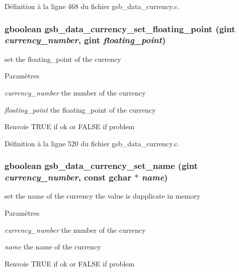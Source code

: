 Définition à la ligne 468 du fichier gsb\_\-data\_\-currency.c.

\subsubsection[{gsb\_\-data\_\-currency\_\-set\_\-floating\_\-point}]{\setlength{\rightskip}{0pt plus 5cm}gboolean gsb\_\-data\_\-currency\_\-set\_\-floating\_\-point (gint {\em currency\_\-number}, \/  gint {\em floating\_\-point})}\label{gsb__data__currency_8c_a2baf075afdbe4d02b0a04831075ea8ae}
set the floating\_\-point of the currency


\begin{DoxyParams}{Paramètres}
\item[{\em currency\_\-number}]the number of the currency \item[{\em floating\_\-point}]the floating\_\-point of the currency\end{DoxyParams}
\begin{DoxyReturn}{Renvoie}
TRUE if ok or FALSE if problem 
\end{DoxyReturn}


Définition à la ligne 520 du fichier gsb\_\-data\_\-currency.c.

\subsubsection[{gsb\_\-data\_\-currency\_\-set\_\-name}]{\setlength{\rightskip}{0pt plus 5cm}gboolean gsb\_\-data\_\-currency\_\-set\_\-name (gint {\em currency\_\-number}, \/  const gchar $\ast$ {\em name})}\label{gsb__data__currency_8c_aa407b241b0ee4aed437ed05f7ede00bb}
set the name of the currency the value is dupplicate in memory


\begin{DoxyParams}{Paramètres}
\item[{\em currency\_\-number}]the number of the currency \item[{\em name}]the name of the currency\end{DoxyParams}
\begin{DoxyReturn}{Renvoie}
TRUE if ok or FALSE if problem 
\end{DoxyReturn}


